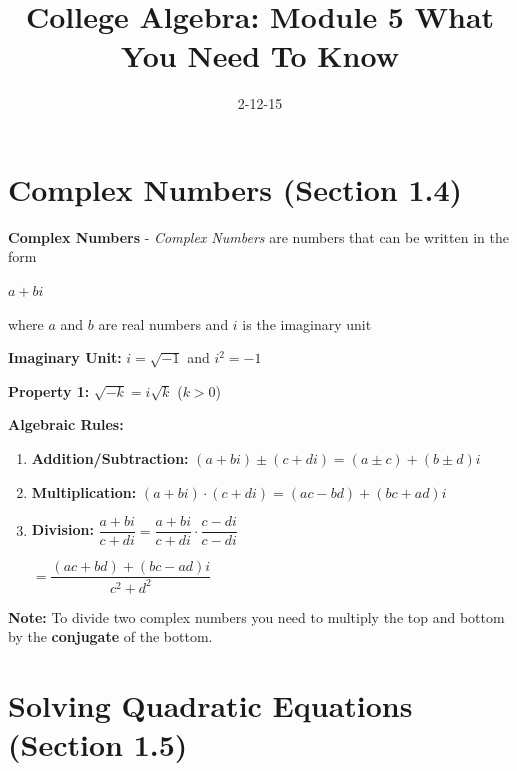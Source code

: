 \documentclass[12pt]{article}
\begin{document}
\title{College Algebra: Module 5 What You Need To Know}
\date{2-12-15}
\author{}
\maketitle


\section{Complex Numbers (Section 1.4)}

\textbf{Complex Numbers} - \textit{Complex Numbers} are numbers that can be written in the form 
\newline

\centerline{$a + bi$} 

\hspace{4cm} where $a$ and $b$ are real numbers and $i$ is the imaginary unit
\newline

\textbf{Imaginary Unit:} $i = \sqrt{-1}$ and $i^{2} = -1$
\newline

\textbf{Property 1:} $\sqrt{-k} = i \sqrt{k}$ \hspace{1cm} ($k > 0$)
\newline

\textbf{Algebraic Rules:}

\begin{enumerate}

\item \textbf{Addition/Subtraction:} $(a + bi) \pm (c+di) = (a \pm c) + (b \pm d)i$
\item \textbf{Multiplication:} $(a + bi) \cdot (c+di) = (ac - bd) + (bc + ad)i$
\item \textbf{Division:} $\dfrac{a+bi}{c+di} = \dfrac{a + bi}{c+di} \cdot \dfrac{c-di}{c-di}$
\newline

 \hspace{3.6cm} $= \dfrac{(ac + bd) + (bc - ad)i}{c^2 + d^2}$ 

\end{enumerate}

\textbf{Note:} To divide two complex numbers you need to multiply the top and bottom by the \textbf{conjugate} of the bottom. 



\section{Solving Quadratic Equations (Section 1.5)}
\end{document}
